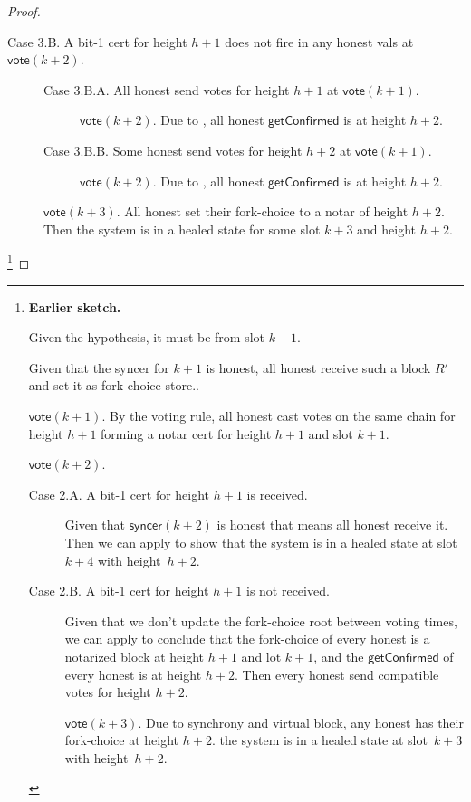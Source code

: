 \documentclass{article}
\newcommand{\syncer}{\mathsf{syncer}}
\newcommand{\vote}{\mathsf{vote}}
\newcommand{\getConfirmed}{\textsf{getConfirmed}\xspace}
\theoremstyle{plain}
\theoremstyle{definition}
\theoremstyle{remark}
\begin{document}
\begin{proof}
{\begin{description}
\begin{description}
    \item[Case 3.B. A bit-1 cert for height $h+1$ does not fire in any honest vals at $\vote(k+2)$.]\hfill

    
    \begin{description}
      \item[Case 3.B.A. All honest send votes for height $h+1$ at $\vote(k+1)$.]\hfill  
      $\vote(k+2)$. Due to , all honest $\getConfirmed$ is at height $h+2$.

      \item[Case 3.B.B. Some honest send votes for height $h+2$ at $\vote(k+1)$.]\hfill  
      $\vote(k+2)$. Due to , all honest $\getConfirmed$ is at height $h+2$.
    \end{description}
    
    $\vote(k+3)$. All honest set their fork-choice to a notar of height $h+2$.
    Then the system is in a healed state for some slot $k+3$ and height $h+2$.
  \end{description}
\end{description}}\footnote{\textbf{Earlier sketch.} \item[Case 2. A notarized block $R'$ for height $h+1$ and conflicting with $R_v^{\vote(k)}$ is received by an honest at time $\vote(k+1)$.] Given the hypothesis, it must be from slot $k-1$.
  

  Given that the syncer for $k+1$ is honest, all honest receive such a block $R'$ and set it as fork-choice store..

  $\vote(k+1)$. By the voting rule, all honest cast votes on the same chain for height $h+1$ forming a notar cert for height $h+1$ and slot $k+1$.

  $\vote(k+2)$. 
  \begin{description}
    \item[Case 2.A. A bit-1 cert for height $h+1$ is received.]
  Given that $\syncer(k+2)$ is honest that means all honest receive it.
  Then we can apply   to show that the system is in a healed state at slot~$k+4$ with height~$h+2$.

    \item[Case 2.B. A bit-1 cert for height $h+1$ is not received.]
    Given that we don't update the fork-choice root between voting times, we can apply  to conclude that the fork-choice of every honest is a notarized block at height $h+1$ and lot $k+1$, and the $\getConfirmed$ of every honest is at height $h+2$.
    Then every honest send compatible votes for height $h+2$.

    $\vote(k+3)$. Due to synchrony and virtual block, any honest has their fork-choice at height $h+2$.  
    the system is in a healed state at slot~$k+3$ with height~$h+2$.
  \end{description}}

\end{proof}
\end{document}
